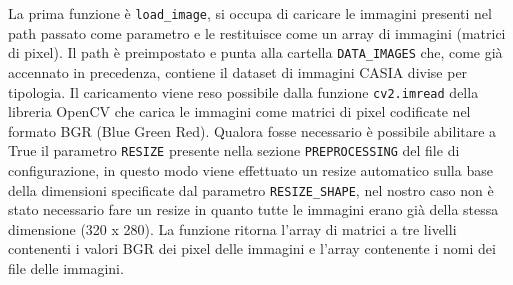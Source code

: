 La prima funzione è \texttt{load\_image}, si occupa di caricare le immagini presenti nel path passato come parametro e le restituisce come un array di immagini (matrici di pixel). Il path è preimpostato e punta alla cartella \texttt{DATA\_IMAGES} che, come già accennato in precedenza, contiene il dataset di immagini CASIA divise per tipologia. Il caricamento viene reso possibile dalla funzione \texttt{cv2.imread} della libreria OpenCV che carica le immagini come matrici di pixel codificate nel formato BGR (Blue Green Red). Qualora fosse necessario è possibile abilitare a True il parametro \texttt{RESIZE} presente nella sezione \texttt{PREPROCESSING} del file di configurazione, in questo modo viene effettuato un resize automatico sulla base della dimensioni specificate dal parametro \texttt{RESIZE\_SHAPE}, nel nostro caso non è stato necessario fare un resize in quanto tutte le immagini erano già della stessa dimensione (320 x 280). La funzione ritorna l’array di matrici a tre livelli contenenti i valori BGR dei pixel delle immagini e l’array contenente i nomi dei file delle immagini.
